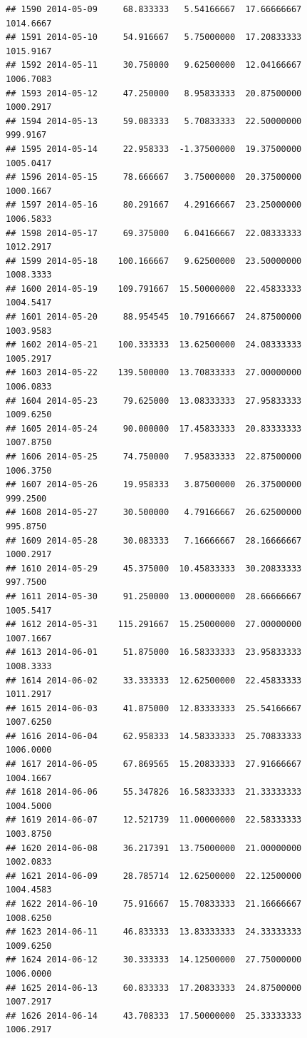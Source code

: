 \documentclass[
]{article}
\begin{document}
\begin{verbatim}
## 1590 2014-05-09     68.833333   5.54166667  17.66666667    1014.6667
## 1591 2014-05-10     54.916667   5.75000000  17.20833333    1015.9167
## 1592 2014-05-11     30.750000   9.62500000  12.04166667    1006.7083
## 1593 2014-05-12     47.250000   8.95833333  20.87500000    1000.2917
## 1594 2014-05-13     59.083333   5.70833333  22.50000000     999.9167
## 1595 2014-05-14     22.958333  -1.37500000  19.37500000    1005.0417
## 1596 2014-05-15     78.666667   3.75000000  20.37500000    1000.1667
## 1597 2014-05-16     80.291667   4.29166667  23.25000000    1006.5833
## 1598 2014-05-17     69.375000   6.04166667  22.08333333    1012.2917
## 1599 2014-05-18    100.166667   9.62500000  23.50000000    1008.3333
## 1600 2014-05-19    109.791667  15.50000000  22.45833333    1004.5417
## 1601 2014-05-20     88.954545  10.79166667  24.87500000    1003.9583
## 1602 2014-05-21    100.333333  13.62500000  24.08333333    1005.2917
## 1603 2014-05-22    139.500000  13.70833333  27.00000000    1006.0833
## 1604 2014-05-23     79.625000  13.08333333  27.95833333    1009.6250
## 1605 2014-05-24     90.000000  17.45833333  20.83333333    1007.8750
## 1606 2014-05-25     74.750000   7.95833333  22.87500000    1006.3750
## 1607 2014-05-26     19.958333   3.87500000  26.37500000     999.2500
## 1608 2014-05-27     30.500000   4.79166667  26.62500000     995.8750
## 1609 2014-05-28     30.083333   7.16666667  28.16666667    1000.2917
## 1610 2014-05-29     45.375000  10.45833333  30.20833333     997.7500
## 1611 2014-05-30     91.250000  13.00000000  28.66666667    1005.5417
## 1612 2014-05-31    115.291667  15.25000000  27.00000000    1007.1667
## 1613 2014-06-01     51.875000  16.58333333  23.95833333    1008.3333
## 1614 2014-06-02     33.333333  12.62500000  22.45833333    1011.2917
## 1615 2014-06-03     41.875000  12.83333333  25.54166667    1007.6250
## 1616 2014-06-04     62.958333  14.58333333  25.70833333    1006.0000
## 1617 2014-06-05     67.869565  15.20833333  27.91666667    1004.1667
## 1618 2014-06-06     55.347826  16.58333333  21.33333333    1004.5000
## 1619 2014-06-07     12.521739  11.00000000  22.58333333    1003.8750
## 1620 2014-06-08     36.217391  13.75000000  21.00000000    1002.0833
## 1621 2014-06-09     28.785714  12.62500000  22.12500000    1004.4583
## 1622 2014-06-10     75.916667  15.70833333  21.16666667    1008.6250
## 1623 2014-06-11     46.833333  13.83333333  24.33333333    1009.6250
## 1624 2014-06-12     30.333333  14.12500000  27.75000000    1006.0000
## 1625 2014-06-13     60.833333  17.20833333  24.87500000    1007.2917
## 1626 2014-06-14     43.708333  17.50000000  25.33333333    1006.2917

\end{verbatim}
\end{document}
